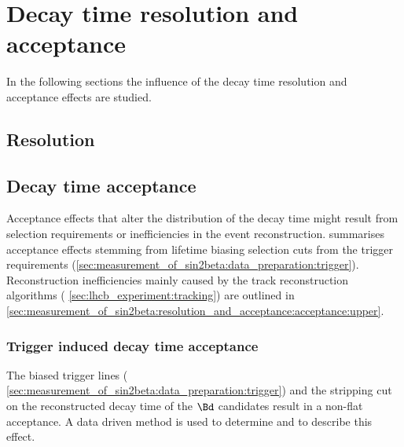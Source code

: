 
\section{Decay time resolution and acceptance}
\label{sec:measurement_of_sin2beta:resolution_and_acceptance}

In the following sections the influence of the decay time resolution and
acceptance effects are studied. 

\subsection{Resolution}
\label{sec:measurement_of_sin2beta:resolution_and_acceptance:resolution}

\subsection{Decay time acceptance}
\label{sec:measurement_of_sin2beta:resolution_and_acceptance:acceptance}

Acceptance effects that alter the distribution of the decay time might result
from selection requirements or inefficiencies in the event reconstruction.
summarises acceptance effects stemming from lifetime biasing selection cuts from
the trigger requirements
(\cf \cref{sec:measurement_of_sin2beta:data_preparation:trigger}). Reconstruction
inefficiencies mainly caused by the \VELO track reconstruction algorithms (\cf
\cref{sec:lhcb_experiment:tracking}) are outlined in
\cref{sec:measurement_of_sin2beta:resolution_and_acceptance:acceptance:upper}.

\subsubsection{Trigger induced decay time acceptance}
\label{sec:measurement_of_sin2beta:resolution_and_acceptance:acceptance:lower}

The biased trigger lines (\cf
\cref{sec:measurement_of_sin2beta:data_preparation:trigger}) and the stripping
cut on the reconstructed decay time of the $\Bd$ candidates result in a non-flat
acceptance. A data driven method is used to determine and to describe this
effect.

